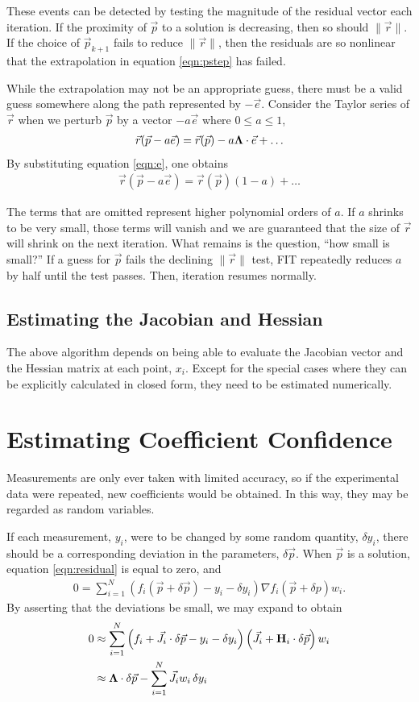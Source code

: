 \documentclass{article}
\def\p{\vec{p}}
\def\r{\vec{r}}
\def\J{\vec{J}}
\def\H{{\bf H}}
\def\LAM{{\bf \Lambda}}
\begin{document}
These events can be detected by testing the magnitude of the residual vector each iteration.  If the proximity of $\p$ to a solution is decreasing, then so should $\|\r\|$.  If the choice of $\p_{k+1}$ fails to reduce $\|\r\|$, then the residuals are so nonlinear that the extrapolation in equation \ref{eqn:pstep} has failed.

While the extrapolation may not be an appropriate guess, there must be a valid guess somewhere along the path represented by $-\vec{e}$.  Consider the Taylor series of $\r$ when we perturb $\p$ by a vector $-a\vec{e}$ where $0\le a\le 1$,
\begin{align}
\r(\p-a\vec{e}) = \r(\p) - a \LAM \cdot \vec{e} + \ldots
\end{align}
By substituting equation \ref{eqn:e}, one obtains
\begin{align}
\r(\p-a\vec{e}) = \r(\p) (1-a) + \ldots
\end{align}

The terms that are omitted represent higher polynomial orders of $a$.  If $a$ shrinks to be very small, those terms will vanish and we are guaranteed that the size of $\r$ will shrink on the next iteration.  What remains is the question, ``how small is small?''  If a guess for $\p$ fails the declining $\|\r\|$ test, FIT repeatedly reduces $a$ by half until the test passes.  Then, iteration resumes normally.

\subsection{Estimating the Jacobian and Hessian}
The above algorithm depends on being able to evaluate the Jacobian vector and the Hessian matrix at each point, $x_i$.  Except for the special cases where they can be explicitly calculated in closed form, they need to be estimated numerically.



\section{Estimating Coefficient Confidence}
Measurements are only ever taken with limited accuracy, so if the experimental data were repeated, new coefficients would be obtained.  In this way, they may be regarded as random variables.

If each measurement, $y_i$, were to be changed by some random quantity, $\delta y_i$, there should be a corresponding deviation in the parameters, $\delta \p$.  When $\p$ is a solution, equation \ref{eqn:residual} is equal to zero, and
\begin{align}
0 = \sum_{i=1}^N \left( f_i(\p + \delta \p) - y_i - \delta y_i \right) \nabla f_i(\p + \delta p) w_i.
\end{align}
By asserting that the deviations be small, we may expand to obtain
\begin{align}
0 &\approx \sum_{i=1}^N \left( f_i + \J_i \cdot \delta\p - y_i - \delta y_i \right) \left( \J_i + \H_i\cdot\delta\p \right)w_i \nonumber\\
&\approx \LAM \cdot \delta \p - \sum_{i=1}^N \J_i w_i\, \delta y_i\nonumber
\end{align}
\end{document}
